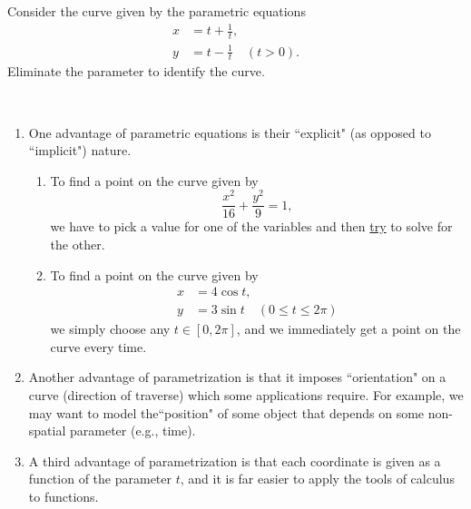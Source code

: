 \newpage

\begin{example}
Consider the curve given by the parametric equations
\begin{align*}
x &= t + \frac{1}{t},\\
y &= t - \frac{1}{t} \quad (t>0).
\end{align*}
Eliminate the parameter to identify the curve.
\end{example}

\ifdefined\SOLUTION
{}
\fi

\newpage

\begin{remark}\,
\begin{enumerate}
\item One advantage of parametric equations is their ``explicit" (as opposed to ``implicit") nature.
\begin{enumerate}
\item To find a point on the curve given by 
\begin{equation*}
\frac{x^2}{16}+\frac{y^2}{9}=1,
\end{equation*}
we have to pick a value for one of the variables and then \underline{try} to solve for the other.
\item To find a point on the curve given by
\begin{align*}
x &=  4\cos t,\\
y &=  3\sin t\quad (0\le t\le 2\pi)
\end{align*}
we simply choose any $t\in [0,2\pi]$, and we immediately get a point on the curve every time.
\end{enumerate}
\item Another advantage of parametrization is that it imposes ``orientation" on a curve (direction of traverse) which some applications require.
For example, we may want to model the``position" of some object that depends on some non-spatial parameter (e.g., time).
\item A third advantage of parametrization is that each coordinate is given as a function of the parameter $t$, and it is far easier to apply the tools of calculus to functions.
\end{enumerate}
\end{remark}

